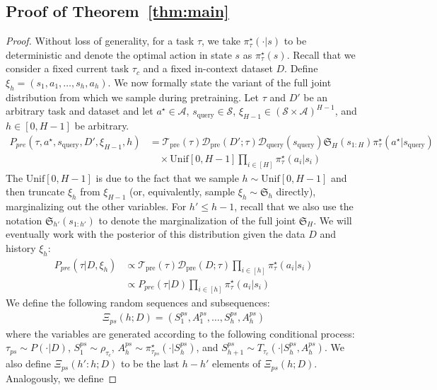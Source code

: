 \documentclass{article}
\newcommand{\Acal}{\mathcal{A}}
\newcommand{\Dcal}{\mathcal{D}}
\newcommand{\Scal}{{\mathcal{S}}}
\newcommand{\Tcal}{{\mathcal{T}}}
\newcommand{\Sfrak}{{\mathfrak{S}}}
\newcommand{\pretraind}{\Dcal_{\text{pre}}}
\newcommand{\pretraint}{\Tcal_{\text{pre}}}
\newcommand{\unif}{\text{Unif}}
\newcommand{\squery}{s_{\text{query}}}
\newcommand{\Dquery}{\Dcal_{\text{query}}}
\newcommand{\pistar}{\pi^{\star}}
\begin{document}
\subsection{Proof of Theorem~\ref{thm:main}}
\thmmain*
\begin{proof}
Without loss of generality, for a task $\tau$, we take $\pistar_\tau(\cdot | s)$ to be deterministic and denote the optimal action in state $s$ as $\pistar_\tau(s)$. Recall that we consider a fixed current task $\tau_c$ and a fixed in-context dataset $D$. Define $\xi_{h} = (s_1, a_1, \ldots, s_{h}, a_{h})$.
We now formally state the variant of the full joint distribution from which we sample during pretraining. Let $\tau$ and $D'$ be an arbitrary task and dataset and let $a^\star \in \Acal$, $\squery \in \Scal$, $\xi_{H - 1} \in (\Scal \times \Acal)^{H-1}$, and $h \in [0, H- 1]$ be arbitrary.
\begin{align}
    P_{pre} (\tau, a^\star, \squery, D', \xi_{H - 1}, h) & =  \pretraint(\tau) \pretraind(D'; \tau) \Dquery(\squery)  \Sfrak_H(s_{1:H}) \pistar_\tau(a^\star |\squery)  \\
    & \quad \times \unif{[0, H - 1]} \prod_{i \in [H]} \pistar_\tau( a_i | s_i)
\end{align}
The $\unif[0, H - 1]$ is due to the fact that we sample $h \sim \unif[0, H
    - 1]$ and then truncate $\xi_h$ from $\xi_{H-1}$ (or, equivalently, sample $\xi_h \sim \Sfrak_h$ directly), marginalizing out the other variables.
For $h' \leq h - 1$, recall that we also use the notation $\Sfrak_{h'}(s_{1:h'})$ to denote the marginalization of the full joint $\Sfrak_H$. We will eventually work with the posterior of this distribution given the data $D$ and history $\xi_h$:
\begin{align}
    P_{pre}(\tau | D, \xi_h) & \propto \pretraint(\tau) \pretraind(D; \tau) \prod_{i \in [h]} \pistar_{\tau}(a_i | s_i) \\
    & \propto P_{pre} (\tau | D) \prod_{i \in [h]} \pistar_{\tau}(a_i | s_i)
\end{align}
We define the following random sequences and subsequences:
\begin{align}
    \Xi_{ps}(h; D) =  \left(S_1^{ps}, A_1^{ps}, \ldots, S_h^{ps}, A_h^{ps}\right)
\end{align}
where the variables are generated according to the following conditional process:  $\tau_{ps} \sim P(\cdot | D)$, $S^{ps}_1 \sim \rho_{\tau_c}$, $A^{ps}_h \sim \pistar_{\tau_{ps}}(\cdot | S^{ps}_h)$, and $S_{h + 1}^{ps} \sim T_{\tau_c} (\cdot  | S_{h}^{ps}, A^{ps}_{h}) $. We also define $\Xi_{ps}(h': h; D)$ to be the last $h - h'$ elements of $\Xi_{ps}(h; D)$. Analogously, we define

\end{proof}
\end{document}
